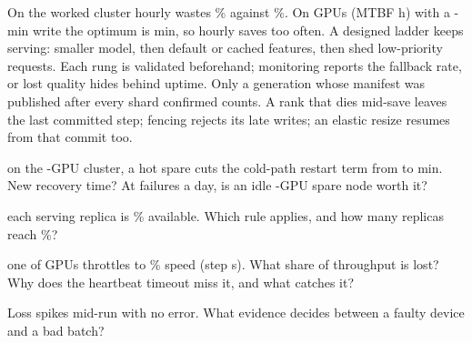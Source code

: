 \documentclass{studysheet}
\begin{document}
\begin{rightcol}
%
  {On the worked cluster hourly wastes \% against \%. On  GPUs (MTBF  h) with a
   -min write the optimum is  min, so hourly saves too often.}{}
%
  {A designed ladder keeps serving: smaller model, then default or cached features, then shed
   low-priority requests. Each rung is validated beforehand; monitoring reports the fallback rate, or
   lost quality hides behind uptime.}{}
%
  {Only a generation whose manifest was published after every shard confirmed counts. A rank that dies mid-save
   leaves the last committed step; fencing rejects its late writes; an elastic resize resumes from that commit too.}{}

\vspace{2pt}
\begin{qs}
\item \assumed{} on the -GPU cluster, a hot spare cuts the cold-path restart term from  to  min. New recovery time?
  At  failures a day, is an idle -GPU spare node worth it?
\item \assumed{} each serving replica is \% available. Which rule applies, and how many replicas reach
  \%?
\item \assumed{} one of  GPUs throttles to \% speed (step  s). What share of throughput
  is lost? Why does the heartbeat timeout miss it, and what catches it?
\item Loss spikes mid-run with no error. What evidence decides between a faulty device and a bad batch?
\end{qs}
\end{rightcol}
\end{document}
